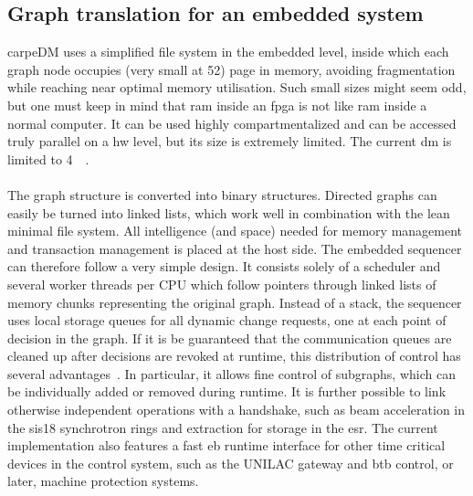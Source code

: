 \subsection{Graph translation for an embedded system}
carpeDM uses a simplified file system in the embedded level, inside which each graph node occupies (very small at \SI{52}{\byte}) page in memory, avoiding fragmentation while reaching near optimal memory utilisation. 
Such small sizes might seem odd, but one must keep in mind that \gls{ram} inside an \gls{fpga} is not like \gls{ram} inside a normal computer. It can be used highly compartmentalized and can be accessed truly parallel on a \gls{hw} level, but its size is extremely limited. The current \gls{dm} is limited to \SI{4}{\mega\byte}.
\paragraph{}
The graph structure is converted into binary structures. Directed graphs can easily be turned into linked lists, which work well in combination with the lean minimal file system.
All intelligence (and space) needed for memory management and transaction management is placed at the host side. The embedded sequencer can therefore follow a very simple design. It consists solely of a scheduler and several worker threads per CPU which follow pointers through linked lists of memory chunks representing the original graph.
Instead of a stack, the sequencer uses local storage queues for all dynamic change requests, one at each point of decision in the graph.
If it is be guaranteed that the communication queues are cleaned up after decisions are revoked at runtime, this distribution of control has several advantages~\cite[]{}. In particular, it allows fine control of subgraphs, which can be individually added or removed during runtime. It is further possible to link otherwise independent operations with a handshake, such as beam acceleration in the \gls{sis18} synchrotron rings and extraction for storage in the \gls{esr}. The current implementation also features a fast \gls{eb} runtime interface for other time critical devices in the control system, such as the UNILAC gateway and \gls{btb} control, or later, machine protection systems.



